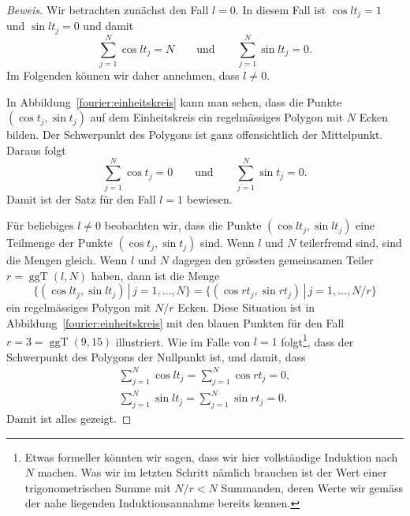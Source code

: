 \begin{proof}[Beweis]
Wir betrachten zunächst den Fall $l=0$.
In diesem Fall ist $\cos lt_j=1$ und $\sin lt_j=0$ und damit
\[
\sum_{j=1}^N \cos lt_j = N
\qquad\text{und}\qquad
\sum_{j=1}^N \sin lt_j = 0.
\]
Im Folgenden können wir daher annehmen, dass $l\ne 0$.

In Abbildung~\eqref{fourier:einheitskreis} kann man sehen, dass die Punkte
$(\cos t_j,\sin t_j)$ auf dem Einheitskreis ein regelmässiges Polygon
mit $N$ Ecken bilden.
Der Schwerpunkt des Polygons ist ganz offensichtlich der Mittelpunkt.
Daraus folgt
\[
\sum_{j=1}^N \cos t_j = 0
\qquad\text{und}\qquad
\sum_{j=1}^N \sin t_j = 0.
\]
Damit ist der Satz für den Fall $l=1$ bewiesen.

Für beliebiges $l\ne 0$ beobachten wir, dass die Punkte 
$(\cos lt_j,\sin lt_j)$ eine Teilmenge der Punkte $(\cos t_j, \sin t_j)$
sind.
Wenn $l$ und $N$ teilerfremd sind, sind die Mengen gleich.
Wenn $l$ und $N$ dagegen den grössten gemeinsamen Teiler
$r=\operatorname{ggT}(l,N)$ haben, dann
ist die Menge 
\[
\{ 
(\cos lt_j,\sin lt_j)\,|\,j=1,\dots,N
\}
=
\{
(\cos rt_j,\sin rt_j)\,|\,j=1,\dots,N/r
\}
\]
ein regelmässiges Polygon mit $N/r$ Ecken.
Diese Situation ist in Abbildung~\ref{fourier:einheitskreis} mit den
blauen Punkten für den Fall $r=3=\operatorname{ggT}(9,15)$
illustriert.
Wie im Falle von $l=1$ folgt\footnote{Etwas formeller könnten wir sagen,
dass wir hier vollständige Induktion nach $N$ machen.
Was wir im letzten Schritt nämlich brauchen ist der Wert einer
trigonometrischen Summe mit $N/r<N$ Summanden, deren Werte wir gemäss
der nahe liegenden Induktionsannahme bereits kennen.},
dass der Schwerpunkt des Polygons der
Nullpunkt ist, und damit, dass
\begin{align*}
\sum_{j=1}^N \cos lt_j 
=
\sum_{j=1}^N \cos rt_j 
=
0,
\\
\sum_{j=1}^N \sin lt_j 
=
\sum_{j=1}^N \sin rt_j 
=
0.
\end{align*}
Damit ist alles gezeigt.
\end{proof}

